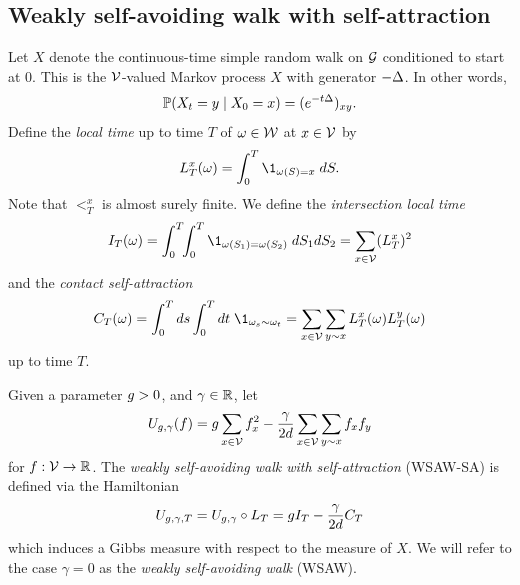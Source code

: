 
\subsection{Weakly self-avoiding walk with self-attraction}

Let $X$ denote the continuous-time simple random walk on $\mathcal{G}$ conditioned
to start at $0$. This is the $\mathcal{V}$-valued Markov process $X$ with generator
$-\Delta$. In other words,
\begin{equation}
\operatorname{\mathbb{P}}(X_t = y \mid X_0 = x) = (e^{-t \Delta})_{xy}.
\end{equation}
Define the \emph{local time} up to time $T$ of $\omega \in \mathcal{W}$ at
$x \in \mathcal{V}$ by
\begin{equation}
\label{e:LTx-def}
\lt^x_T(\omega) = \int_0^T \1_{\omega(S)=x} \; dS.
\end{equation}
Note that $\lt^x_T$ is almost surely finite.
We define the \emph{intersection local time}
\begin{equation}
\label{e:ITdef}
I_T(\omega)
	=
\int_0^T \!\! \int_0^T \1_{\omega(S_1)=\omega(S_2)} \; dS_1 dS_2
	=
\sum_{x\in\vertices} (\lt^x_T)^2
\end{equation}
and the \emph{contact self-attraction}
\begin{equation}
\label{e:CTdef}
C_T(\omega)
	=
\int_0^T ds \int_0^T dt \; \1_{\omega_s \sim \omega_t}
	=
\sum_{x \in \vertices} \sum_{y \sim x} \lt_T^x(\omega) \lt_T^y(\omega)
\end{equation}
up to time $T$.

Given a parameter $g > 0$, and $\gamma \in {\mathbb R}$, let
\begin{equation}
\label{e:Udef-neg}
U_{g,\gamma}(f)
=
g \sum_{x\in\mathcal{V}} f_x^2
- \frac{\gamma}{2d}
\sum_{x\in\mathcal{V}} \sum_{y \sim x} f_x f_y
\end{equation}
for $f : \mathcal{V} \rightarrow {\mathbb R}$.
The \emph{weakly self-avoiding walk with self-attraction} (WSAW-SA) is defined
via the Hamiltonian
\begin{equation}
\label{e:V}
U_{g,\gamma,T}
	= U_{g,\gamma} \circ L_T
	= g I_T - \frac{\gamma}{2 d} C_T
\end{equation}
which induces a Gibbs measure with respect to the measure of $X$.
We will refer to the case $\gamma = 0$ as the \emph{weakly self-avoiding walk} (WSAW).

